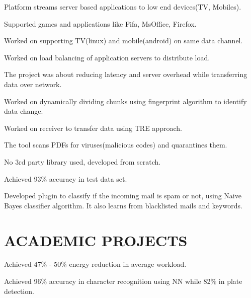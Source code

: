 \documentclass[]{deedy-resume-openfont}
\begin{document}
\begin{minipage}[t]{0.65\textwidth}
\location{}
\begin{tightemize}
\item Platform streams server based applications to low end devices(TV, Mobiles).
\item Supported games and applications like Fifa, MsOffice, Firefox.
\item Worked on supporting TV(linux) and mobile(android) on same data channel.
\item Worked on load balancing of application servers to distribute load.
\end{tightemize}
\sectionsep

\location{}
\begin{tightemize}
\item The project was about reducing latency and server overhead while transferring data over network.
\item Worked on dynamically dividing chunks using fingerprint algorithm to identify data change.
\item Worked on receiver to transfer data using TRE approach.
\end{tightemize}
\sectionsep

\location{}
\begin{tightemize}
\item The tool scans PDFs for viruses(malicious codes) and quarantines them.
\item No 3rd party library used, developed from scratch.
\item Achieved 93\% accuracy in test data set.
\end{tightemize}
\sectionsep

\location{}
\begin{tightemize}
\item Developed plugin to classify if the incoming mail is spam or not, using Naive Bayes classifier algorithm.  It also learns from blacklisted mails and keywords.
\end{tightemize}
\sectionsep

\section{ACADEMIC PROJECTS}
\location{}
\begin{tightemize}
\item Achieved 47\% - 50\% energy reduction in average workload.  
\end{tightemize}
\sectionsep

\begin{tightemize}
\item Achieved 96\% accuracy in character recognition using NN while 82\% in plate detection.
\end{tightemize}
\sectionsep


\end{minipage} 
\end{document}
